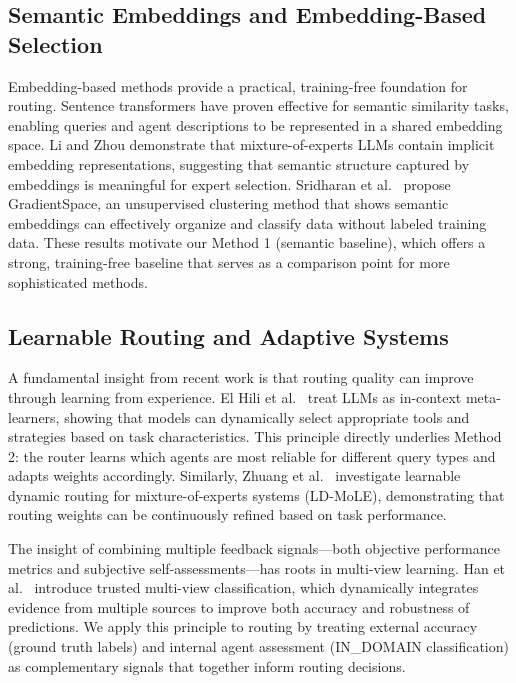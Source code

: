 \documentclass[11pt]{article}
\begin{document}
\subsection{Semantic Embeddings and Embedding-Based Selection}

Embedding-based methods provide a practical, training-free foundation for routing. Sentence transformers have proven effective for semantic similarity tasks, enabling queries and agent descriptions to be represented in a shared embedding space. Li and Zhou \cite{Li2024} demonstrate that mixture-of-experts LLMs contain implicit embedding representations, suggesting that semantic structure captured by embeddings is meaningful for expert selection. Sridharan et al.\ \cite{Sridharan2025} propose GradientSpace, an unsupervised clustering method that shows semantic embeddings can effectively organize and classify data without labeled training data. These results motivate our Method 1 (semantic baseline), which offers a strong, training-free baseline that serves as a comparison point for more sophisticated methods.

\subsection{Learnable Routing and Adaptive Systems}

A fundamental insight from recent work is that routing quality can improve through learning from experience. El Hili et al.\ \cite{ElHili2025} treat LLMs as in-context meta-learners, showing that models can dynamically select appropriate tools and strategies based on task characteristics. This principle directly underlies Method 2: the router learns which agents are most reliable for different query types and adapts weights accordingly. Similarly, Zhuang et al.\ \cite{Zhuang2025} investigate learnable dynamic routing for mixture-of-experts systems (LD-MoLE), demonstrating that routing weights can be continuously refined based on task performance.

The insight of combining multiple feedback signals—both objective performance metrics and subjective self-assessments—has roots in multi-view learning. Han et al.\ \cite{Han2021} introduce trusted multi-view classification, which dynamically integrates evidence from multiple sources to improve both accuracy and robustness of predictions. We apply this principle to routing by treating external accuracy (ground truth labels) and internal agent assessment (IN\_DOMAIN classification) as complementary signals that together inform routing decisions.
\end{document}
